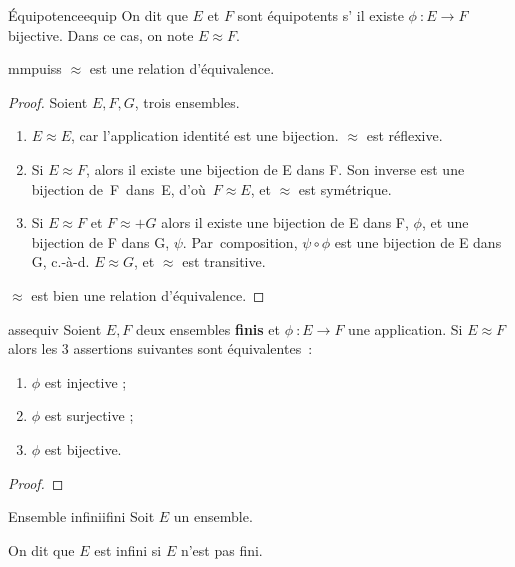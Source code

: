 \documentclass[a4paper,french,final]{memoir}
\begin{document}
\begin{defb}{\'Equipotence}{equip}
    On dit que $E$ et $F$ sont équipotents s' il existe $\phi~: E \to F$ bijective. Dans ce cas, on note $E \mathrel{\approx} F$.
\end{defb}
\begin{theoremb}{}{mmpuiss}
    $ \mathrel{\approx}$ est une relation d'équivalence.
\end{theoremb}
\begin{proof}
    Soient $E, F, G$, trois ensembles.
	\begin{enumerate}
		\item $E \mathrel{\approx} E$, car l'application identité est une bijection. $\mathrel{\approx}$ est réflexive.
		\item Si $E \mathrel{\approx} F$, alors il existe une bijection de E dans F. Son inverse est une bijection de~F~dans~E, d'où~${F \mathrel{\approx} E}$, et $\mathrel{\approx}$ est symétrique.
		\item Si $E \mathrel{\approx} F$ et $F \mathrel{\approx}+ G$ alors il existe une bijection de E dans F, $\phi$, et une bijection de F dans G, $\psi$. Par~composition, $\psi\circ\phi$ est une bijection de E dans G, c.-à-d. $E \mathrel{\approx} G$, et  $\mathrel{\approx}$ est transitive.
	\end{enumerate}
	$\mathrel{\approx}$ est bien une relation d'équivalence.
\end{proof}

\begin{theoremb}{}{assequiv}
	Soient $E, F$ deux ensembles \textbf{finis} et $\phi~: E \to F$ une application. Si $E \mathrel{\approx} F$ alors les 3 assertions suivantes sont équivalentes~:

	\begin{enumerate}
		\item $\phi$ est injective ;
		\item $\phi$ est surjective ;
		\item $\phi$ est bijective.
	\end{enumerate}
  \end{theoremb}

\begin{proof}
\textellipsis
\end{proof}
\begin{defb}{Ensemble infini}{ifini}
	Soit $E$ un ensemble.

	On dit que $E$ est infini si $E$ n'est pas fini.
\end{defb}
\end{document}
